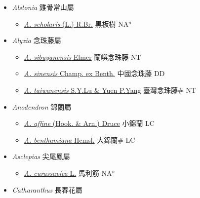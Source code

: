 
  \begin{itemize}
 \item[] \textit{Alstonia} 雞骨常山屬
                    
  \begin{itemize}
        \item[] \href{http://www.theplantlist.org/tpl1.1/search?q=Alstonia+scholaris}{\textit{A. scholaris} (L.) R.Br.}   黑板樹 NA$^n$
  \end{itemize}
 \item[] \textit{Alyxia} 念珠藤屬
                    
  \begin{itemize}
        \item[] \href{http://www.theplantlist.org/tpl1.1/search?q=Alyxia+sibuyanensis}{\textit{A. sibuyanensis} Elmer}   蘭嶼念珠藤 NT
        \item[] \href{http://www.theplantlist.org/tpl1.1/search?q=Alyxia+sinensis}{\textit{A. sinensis} Champ. ex Benth.}   中國念珠藤 DD
        \item[] \href{http://www.theplantlist.org/tpl1.1/search?q=Alyxia+taiwanensis}{\textit{A. taiwanensis} S.Y.Lu \& Yuen P.Yang}   臺灣念珠藤\# NT
  \end{itemize}
 \item[] \textit{Anodendron} 錦蘭屬
                    
  \begin{itemize}
        \item[] \href{http://www.theplantlist.org/tpl1.1/search?q=Anodendron+affine}{\textit{A. affine} (Hook. \& Arn.) Druce}   小錦蘭 LC
        \item[] \href{http://www.theplantlist.org/tpl1.1/search?q=Anodendron+benthamiana}{\textit{A. benthamiana} Hemsl.}   大錦蘭\# LC
  \end{itemize}
 \item[] \textit{Asclepias} 尖尾鳳屬
                    
  \begin{itemize}
        \item[] \href{http://www.theplantlist.org/tpl1.1/search?q=Asclepias+curassavica}{\textit{A. curassavica} L.}   馬利筋 NA$^n$
  \end{itemize}
 \item[] \textit{Catharanthus} 長春花屬
                    

\end{itemize}
